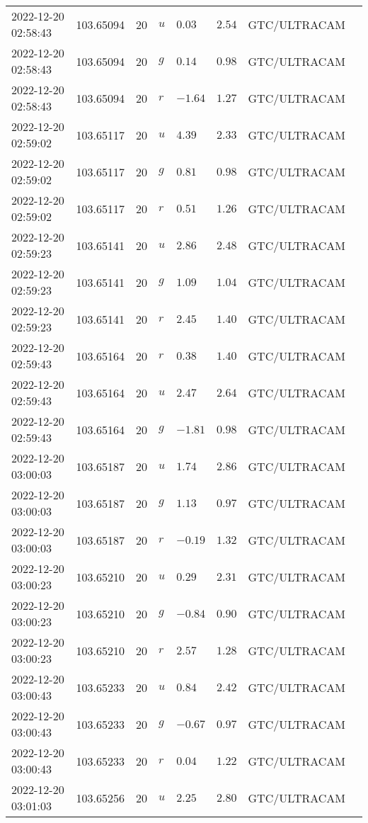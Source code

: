 \documentclass{nature_plusfigure}
\begin{document}
\begin{supplement}
\begin{center}
\begin{longtable}{llllllll}
2022-12-20 02:58:43 & 103.65094 & 20 & $u$ & $0.03$ & $2.54$ & GTC/ULTRACAM &  \\ 
2022-12-20 02:58:43 & 103.65094 & 20 & $g$ & $0.14$ & $0.98$ & GTC/ULTRACAM &  \\ 
2022-12-20 02:58:43 & 103.65094 & 20 & $r$ & $-1.64$ & $1.27$ & GTC/ULTRACAM &  \\ 
2022-12-20 02:59:02 & 103.65117 & 20 & $u$ & $4.39$ & $2.33$ & GTC/ULTRACAM &  \\ 
2022-12-20 02:59:02 & 103.65117 & 20 & $g$ & $0.81$ & $0.98$ & GTC/ULTRACAM &  \\ 
2022-12-20 02:59:02 & 103.65117 & 20 & $r$ & $0.51$ & $1.26$ & GTC/ULTRACAM &  \\ 
2022-12-20 02:59:23 & 103.65141 & 20 & $u$ & $2.86$ & $2.48$ & GTC/ULTRACAM &  \\ 
2022-12-20 02:59:23 & 103.65141 & 20 & $g$ & $1.09$ & $1.04$ & GTC/ULTRACAM &  \\ 
2022-12-20 02:59:23 & 103.65141 & 20 & $r$ & $2.45$ & $1.40$ & GTC/ULTRACAM &  \\ 
2022-12-20 02:59:43 & 103.65164 & 20 & $r$ & $0.38$ & $1.40$ & GTC/ULTRACAM &  \\ 
2022-12-20 02:59:43 & 103.65164 & 20 & $u$ & $2.47$ & $2.64$ & GTC/ULTRACAM &  \\ 
2022-12-20 02:59:43 & 103.65164 & 20 & $g$ & $-1.81$ & $0.98$ & GTC/ULTRACAM &  \\ 
2022-12-20 03:00:03 & 103.65187 & 20 & $u$ & $1.74$ & $2.86$ & GTC/ULTRACAM &  \\ 
2022-12-20 03:00:03 & 103.65187 & 20 & $g$ & $1.13$ & $0.97$ & GTC/ULTRACAM &  \\ 
2022-12-20 03:00:03 & 103.65187 & 20 & $r$ & $-0.19$ & $1.32$ & GTC/ULTRACAM &  \\ 
2022-12-20 03:00:23 & 103.65210 & 20 & $u$ & $0.29$ & $2.31$ & GTC/ULTRACAM &  \\ 
2022-12-20 03:00:23 & 103.65210 & 20 & $g$ & $-0.84$ & $0.90$ & GTC/ULTRACAM &  \\ 
2022-12-20 03:00:23 & 103.65210 & 20 & $r$ & $2.57$ & $1.28$ & GTC/ULTRACAM &  \\ 
2022-12-20 03:00:43 & 103.65233 & 20 & $u$ & $0.84$ & $2.42$ & GTC/ULTRACAM &  \\ 
2022-12-20 03:00:43 & 103.65233 & 20 & $g$ & $-0.67$ & $0.97$ & GTC/ULTRACAM &  \\ 
2022-12-20 03:00:43 & 103.65233 & 20 & $r$ & $0.04$ & $1.22$ & GTC/ULTRACAM &  \\ 
2022-12-20 03:01:03 & 103.65256 & 20 & $u$ & $2.25$ & $2.80$ & GTC/ULTRACAM &  \\ 

\end{longtable}
\end{center}
\end{supplement}
\end{document}
